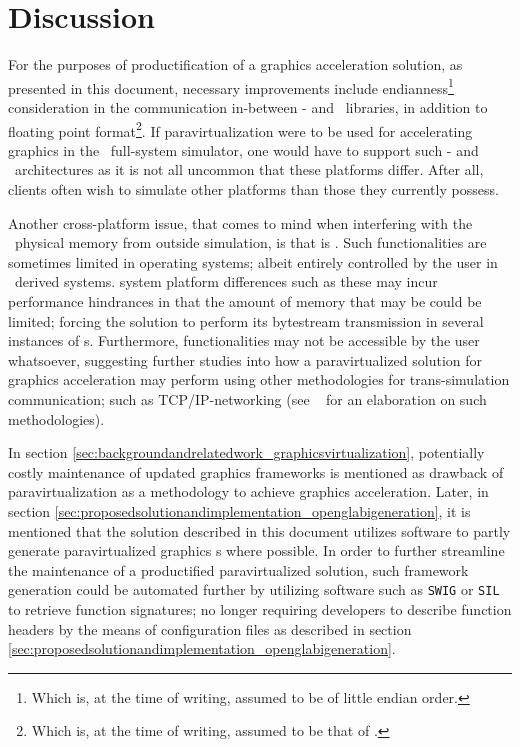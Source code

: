 
\chapter{Discussion}
\label{cha:discussion}
For the purposes of productification of a graphics acceleration solution, as presented in this document, necessary improvements include endianness\footnote{Which is, at the time of writing, assumed to be of little endian order.} consideration in the communication in-between \dvttermtarget - and \dvttermhost\ libraries, in addition to floating point format\footnote{Which is, at the time of writing, assumed to be that of \dvttermieeefp .}.
If paravirtualization were to be used for accelerating graphics in the \dvttermsimics\ full-system simulator, one would have to support such \dvttermtarget - and \dvttermhost\ architectures as it is not all uncommon that these platforms differ.
After all, clients often wish to simulate other platforms than those they currently possess.

Another cross-platform issue, that comes to mind when interfering with the \dvttermtarget\ physical memory from outside simulation, is that is .
Such functionalities are sometimes limited in operating systems; albeit entirely controlled by the user in \dvttermlinux\ derived systems.
 system platform differences such as these may incur performance hindrances in that the amount of memory that may be  could be limited; forcing the solution to perform its bytestream transmission in several instances of \dvttermmagicinstruction s.
Furthermore,  functionalities may not be accessible by the user whatsoever, suggesting further studies into how a paravirtualized solution for graphics acceleration may perform using other methodologies for trans-simulation communication; such as TCP/IP-networking (see ~ for an elaboration on such methodologies).

In section \ref{sec:backgroundandrelatedwork_graphicsvirtualization}, potentially costly maintenance of updated graphics frameworks is mentioned as drawback of paravirtualization as a methodology to achieve graphics acceleration.
Later, in section \ref{sec:proposedsolutionandimplementation_openglabigeneration}, it is mentioned that the solution described in this document utilizes software to partly generate paravirtualized graphics \dvttermabi s where possible.
In order to further streamline the maintenance of a productified paravirtualized solution, such framework generation could be automated further by utilizing software such as \texttt{SWIG} or \texttt{SIL} to retrieve function signatures; no longer requiring developers to describe function headers by the means of configuration files as described in section \ref{sec:proposedsolutionandimplementation_openglabigeneration}.

